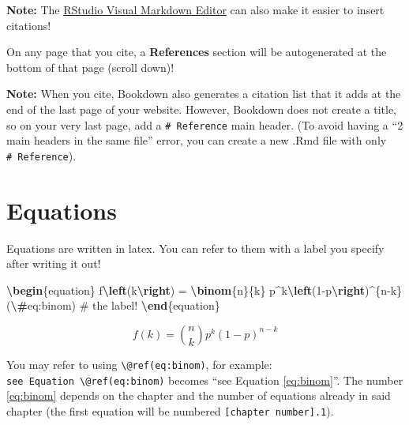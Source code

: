 \documentclass[
]{book}
\newenvironment{Shaded}{\begin{snugshade}}{\end{snugshade}}
\newcommand{\ExtensionTok}[1]{#1}
\newcommand{\KeywordTok}[1]{\textcolor[rgb]{0.13,0.29,0.53}{\textbf{#1}}}
\newcommand{\NormalTok}[1]{#1}
\newcommand{\SpecialCharTok}[1]{\textcolor[rgb]{0.81,0.36,0.00}{\textbf{#1}}}
\newcommand{\SpecialStringTok}[1]{\textcolor[rgb]{0.31,0.60,0.02}{#1}}
\theoremstyle{definition}
\theoremstyle{definition}
\theoremstyle{definition}
\theoremstyle{definition}
\theoremstyle{remark}
\begin{document}
\textbf{Note:} The \hyperref[visual-r-md]{RStudio Visual Markdown Editor} can also make it easier to insert citations!

On any page that you cite, a \textbf{References} section will be autogenerated at the bottom of that page (scroll down)!

\textbf{Note:} When you cite, Bookdown also generates a citation list that it adds at the end of the last page of your website. However, Bookdown does not create a title, so on your very last page, add a \texttt{\#\ Reference} main header. (To avoid having a ``2 main headers in the same file'' error, you can create a new .Rmd file with only \texttt{\#\ Reference}).

\section{Equations}\label{equations}

Equations are written in latex. You can refer to them with a label you specify after writing it out!

\begin{Shaded}
\begin{Highlighting}[]
\KeywordTok{\textbackslash{}begin}\NormalTok{\{}\ExtensionTok{equation}\NormalTok{\}}
\SpecialStringTok{  f}\SpecialCharTok{\textbackslash{}left}\SpecialStringTok{(k}\SpecialCharTok{\textbackslash{}right}\SpecialStringTok{) = }\SpecialCharTok{\textbackslash{}binom}\SpecialStringTok{\{n\}\{k\} p\^{}k}\SpecialCharTok{\textbackslash{}left}\SpecialStringTok{(1{-}p}\SpecialCharTok{\textbackslash{}right}\SpecialStringTok{)\^{}\{n{-}k\}}
\SpecialStringTok{  (}\SpecialCharTok{\textbackslash{}\#}\SpecialStringTok{eq:binom) \# the label!}
\KeywordTok{\textbackslash{}end}\NormalTok{\{}\ExtensionTok{equation}\NormalTok{\}}
\end{Highlighting}
\end{Shaded}

\begin{equation}
  f\left(k\right) = \binom{n}{k} p^k\left(1-p\right)^{n-k}
  \label{eq:binom}
\end{equation}

You may refer to using \texttt{\textbackslash{}@ref(eq:binom)}, for example: \texttt{see\ Equation\ \textbackslash{}@ref(eq:binom)} becomes ``see Equation \eqref{eq:binom}''. The number \eqref{eq:binom} depends on the chapter and the number of equations already in said chapter (the first equation will be numbered \texttt{{[}chapter\ number{]}.1}).
\end{document}

